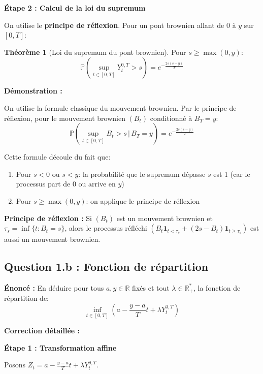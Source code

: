 \documentclass[12pt,a4paper]{article}
\theoremstyle{definition}
\newtheorem{theorem}{Théorème}[section]
\newcommand{\R}{\mathbb{R}}
\newcommand{\prob}{\mathbb{P}}
\newcommand{\ind}{\mathbf{1}}
\begin{document}
\textbf{Étape 2 : Calcul de la loi du supremum}

On utilise le \textbf{principe de réflexion}. Pour un pont brownien allant de 0 à $y$ sur $[0,T]$:

\begin{theorem}[Loi du supremum du pont brownien]
Pour $s \geq \max(0, y)$:
\[
\prob\left( \sup_{t \in [0,T]} Y_t^{0,T} > s \right) = e^{-\frac{2s(s-y)}{T}}
\]
\end{theorem}

\textbf{Démonstration :}

On utilise la formule classique du mouvement brownien. Par le principe de réflexion, pour le mouvement brownien $(B_t)$ conditionné à $B_T = y$:
\[
\prob\left( \sup_{t \in [0,T]} B_t > s \,\Big|\, B_T = y \right) = e^{-\frac{2s(s-y)}{T}}
\]

Cette formule découle du fait que:
\begin{enumerate}
    \item Pour $s < 0$ ou $s < y$: la probabilité que le supremum dépasse $s$ est 1 (car le processus part de 0 ou arrive en $y$)
    \item Pour $s \geq \max(0, y)$: on applique le principe de réflexion
\end{enumerate}

\begin{rappel}
\textbf{Principe de réflexion :} Si $(B_t)$ est un mouvement brownien et $\tau_s = \inf\{t : B_t = s\}$, alors le processus réfléchi $(B_t \ind_{t < \tau_s} + (2s - B_t)\ind_{t \geq \tau_s})$ est aussi un mouvement brownien.
\end{rappel}

\subsection{Question 1.b : Fonction de répartition}

\textbf{Énoncé :} En déduire pour tous $a, y \in \R$ fixés et tout $\lambda \in \R_+^*$, la fonction de répartition de:
\[
\inf_{t \in [0,T]} \left( a - \frac{y-a}{T}t + \lambda Y_t^{0,T} \right)
\]

\textbf{Correction détaillée :}

\textbf{Étape 1 : Transformation affine}

Posons $Z_t = a - \frac{y-a}{T}t + \lambda Y_t^{0,T}$.
\end{document}
